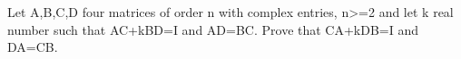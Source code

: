 Let A,B,C,D four matrices of order n with complex entries, n>=2 and let k real number such that AC+kBD=I and AD=BC. Prove that CA+kDB=I and DA=CB.